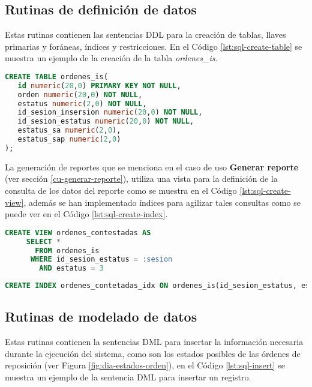 \subsection{Rutinas de definición de datos}
Estas rutinas contienen las sentencias DDL para la creación de tablas, llaves primarias y foráneas, índices y restricciones. En el Código \ref{lst:sql-create-table} se muestra un ejemplo de la creación de la tabla \textit{ordenes\_is}.
\begin{lstlisting}[language=SQL, caption={Sentencia para crear una tabla.}, captionpos=b, label={lst:sql-create-table}]
CREATE TABLE ordenes_is(
   id numeric(20,0) PRIMARY KEY NOT NULL,
   orden numeric(20,0) NOT NULL,
   estatus numeric(2,0) NOT NULL,
   id_sesion_insersion numeric(20,0) NOT NULL,
   id_sesion_estatus numeric(20,0) NOT NULL,
   estatus_sa numeric(2,0),
   estatus_sap numeric(2,0)
);
\end{lstlisting}

La generación de reportes que se menciona en el caso de uso \textbf{Generar reporte} (ver sección \ref{cu-generar-reporte}), utiliza una vista para la definición de la consulta de los datos del reporte como se muestra en el Código \ref{lst:sql-create-view}, además se han implementado índices para agilizar tales consultas como se puede ver en el Código \ref{lst:sql-create-index}.

\begin{lstlisting}[language=SQL, caption={Sentencia para crear una vista.}, captionpos=b, label={lst:sql-create-view}]
CREATE VIEW ordenes_contestadas AS
     SELECT *
       FROM ordenes_is
      WHERE id_sesion_estatus = :sesion
        AND estatus = 3
\end{lstlisting}

\begin{lstlisting}[language=SQL, caption={Sentencia para crear un índice.}, captionpos=b, label={lst:sql-create-index}]
CREATE INDEX ordenes_contetadas_idx ON ordenes_is(id_sesion_estatus, estatus);
\end{lstlisting}

\subsection{Rutinas de modelado de datos}
Estas rutinas contienen la sentencias DML para insertar la información necesaria durante la ejecución del sistema, como son los estados posibles de las órdenes de reposición (ver Figura \ref{fig:dia-estados-orden}), en el Código \ref{lst:sql-insert} se muestra un ejemplo de la sentencia DML para insertar un registro.

